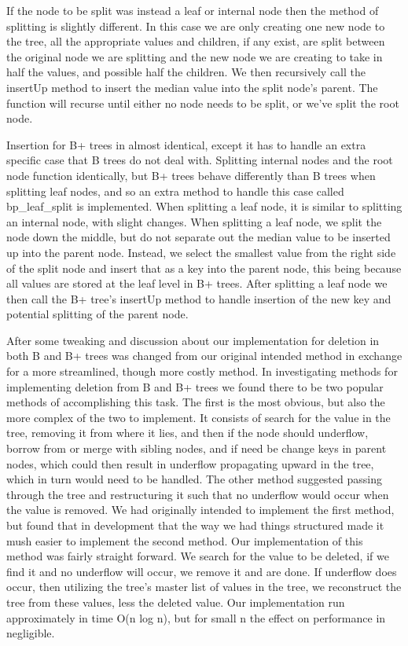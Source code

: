 If the node to be split was instead a leaf or internal node then the
method of splitting is slightly different.  In this case we are only
creating one new node to the tree, all the appropriate values and
children, if any exist, are split between the original node we are
splitting and the new node we are creating to take in half the values,
and possible half the children.  We then recursively call the insertUp
method to insert the median value into the split node's parent.  The
function will recurse until either no node needs to be split, or we've
split the root node.

Insertion for B+ trees in almost identical, except it has to handle an
extra specific case that B trees do not deal with.  Splitting internal
nodes and the root node function identically, but B+ trees behave
differently than B trees when splitting leaf nodes, and so an extra
method to handle this case called bp\_leaf\_split is implemented.
When splitting a leaf node, it is similar to splitting an internal
node, with slight changes.  When splitting a leaf node, we split the
node down the middle, but do not separate out the median value to be
inserted up into the parent node.  Instead, we select the smallest
value from the right side of the split node and insert that as a key
into the parent node, this being because all values are stored at the
leaf level in B+ trees.  After splitting a leaf node we then call the
B+ tree's insertUp method to handle insertion of the new key and
potential splitting of the parent node.

After some tweaking and discussion about our implementation for
deletion in both B and B+ trees was changed from our original intended
method in exchange for a more streamlined, though more costly method.
In investigating methods for implementing deletion from B and B+ trees
we found there to be two popular methods of accomplishing this task.
The first is the most obvious, but also the more complex of the two to
implement.  It consists of search for the value in the tree, removing
it from where it lies, and then if the node should underflow, borrow
from or merge with sibling nodes, and if need be change keys in parent
nodes, which could then result in underflow propagating upward in the
tree, which in turn would need to be handled.  The other method
suggested passing through the tree and restructuring it such that no
underflow would occur when the value is removed.  We had originally
intended to implement the first method, but found that in development
that the way we had things structured made it mush easier to implement
the second method.  Our implementation of this method was fairly
straight forward.  We search for the value to be deleted, if we find
it and no underflow will occur, we remove it and are done.  If
underflow does occur, then utilizing the tree's master list of values
in the tree, we reconstruct the tree from these values, less the
deleted value.  Our implementation run approximately in time O(n log
n), but for small n the effect on performance in negligible.

